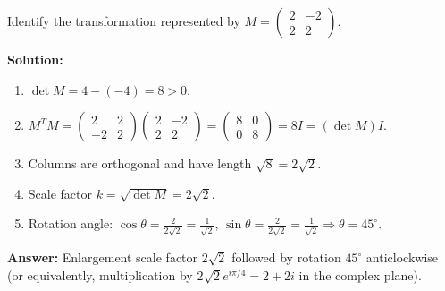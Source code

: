\documentclass[11pt]{article}
\begin{document}
\begin{exoresolu}
Identify the transformation represented by $M = \begin{pmatrix} 2 & -2 \\ 2 & 2 \end{pmatrix}$.
\par
\tcblower
\textbf{Solution:}
\begin{enumerate}
\item $\det M = 4 - (-4) = 8 > 0$.
\item $M^T M = \begin{pmatrix} 2 & 2 \\ -2 & 2 \end{pmatrix}\begin{pmatrix} 2 & -2 \\ 2 & 2 \end{pmatrix} = \begin{pmatrix} 8 & 0 \\ 0 & 8 \end{pmatrix} = 8I = (\det M)I$.
\item Columns are orthogonal and have length $\sqrt{8} = 2\sqrt{2}$.
\item Scale factor $k = \sqrt{\det M} = 2\sqrt{2}$.
\item Rotation angle: $\cos\theta = \frac{2}{2\sqrt{2}} = \frac{1}{\sqrt{2}}$, $\sin\theta = \frac{2}{2\sqrt{2}} = \frac{1}{\sqrt{2}} \Rightarrow \theta = 45^\circ$.
\end{enumerate}
\textbf{Answer:} Enlargement scale factor $2\sqrt{2}$ followed by rotation $45^\circ$ anticlockwise (or equivalently, multiplication by $2\sqrt{2}e^{i\pi/4} = 2+2i$ in the complex plane).
\end{exoresolu}
\end{document}
